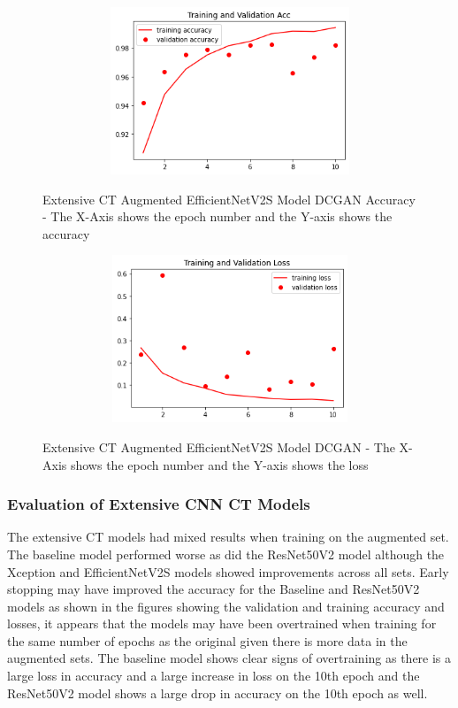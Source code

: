  \begin{figure}[H]
    \centering    \includegraphics[width=1\textwidth,height=5cm,keepaspectratio]{Images/EfficientNetV2STrainingValidationAccuracyExtensiveCTAugmentedDCGAN.png}\\
    \caption{Extensive CT Augmented EfficientNetV2S Model DCGAN Accuracy - The X-Axis shows the epoch number and the Y-axis shows the accuracy}
    \label{fig:Extensive CT Augmented EfficientNetV2S Model DCGAN Accuracy}
\end{figure}
 \begin{figure}[H]
    \centering
    \includegraphics[width=1\textwidth,height=5cm,keepaspectratio]{Images/EfficientNetV2SBaselineTrainingValidationLossExtensiveCT.png}\\
    \caption{Extensive CT Augmented EfficientNetV2S Model DCGAN - The X-Axis shows the epoch number and the Y-axis shows the loss}
    \label{fig:Extensive CT Augmented EfficientNetV2S Model DCGAN Loss}
\end{figure}
\subsubsection{Evaluation of Extensive CNN CT Models}
The extensive CT models had mixed results when training on the augmented set.  The baseline model performed worse as did the ResNet50V2 model although the Xception and EfficientNetV2S models showed improvements across all sets.  Early stopping may have improved the accuracy for the Baseline and ResNet50V2 models as shown in the figures showing the validation and training accuracy and losses, it appears that the models may have been overtrained when training for the same number of epochs as the original given there is more data in the augmented sets.  The baseline model shows clear signs of overtraining as there is a large loss in accuracy and a large increase in loss on the 10th epoch and the ResNet50V2 model shows a large drop in accuracy on the 10th epoch as well.
